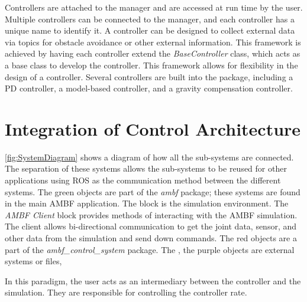 Controllers are attached to the manager and are accessed at run time by the user. Multiple controllers can be connected to the manager, and each controller has a unique name to identify it. A controller can be designed to collect external data via topics for obstacle avoidance or other external information. This framework is achieved by having each controller extend the \textit{BaseController} class, which acts as a base class to develop the controller. This framework allows for flexibility in the design of a controller. Several controllers are built into the package, including a PD controller, a model-based controller, and a gravity compensation controller.  



\section{Integration of Control Architecture}

\autoref{fig:SystemDiagram} shows a diagram of how all the sub-systems are connected. The separation of these systems allows the sub-systems to be reused for other applications using ROS as the communication method between the different systems. The green objects are part of the \textit{ambf} package; these systems are found in the main AMBF application. The  block is the simulation environment. The \textit{AMBF Client} block provides methods of interacting with the AMBF simulation. The client allows bi-directional communication to get the joint data, sensor, and other data from the simulation and send down commands. The red objects are a part of the \textit{ambf\_control\_system} package. The 
, the purple objects are external systems or files, 

 In this paradigm, the user acts as an intermediary between the controller and the simulation. They are responsible for controlling the controller rate.  



